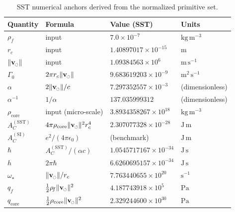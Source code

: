 \documentclass[pdflatex,sn-mathphys-num]{revtex4-2}
\newcommand{\swirlarrow}{\mathchoice{\mkern-2mu\scriptstyle\boldsymbol{\circlearrowleft}}{\mkern-2mu\scriptstyle\boldsymbol{\circlearrowleft}}{\mkern-2mu\scriptscriptstyle\boldsymbol{\circlearrowleft}}{\mkern-2mu\scriptscriptstyle\boldsymbol{\circlearrowleft}}}
\newcommand{\rhoF}{\rho_{\!f}}   %
\newcommand{\rhocore}{\rho_{\text{core}}}
\newcommand{\vswirl}{\mathbf{v}_{\swirlarrow}}
\newcommand{\vnorm}{\lVert \vswirl \rVert}
\providecommand{\rc}{r_c}
\newcommand{\clight}{c}
\begin{document}
        \begin{table}[h]
            \centering
            \caption{SST numerical anchors derived from the normalized primitive set.}
            \label{tab:anchors}
            \begin{tabular}{@{}llll@{}}
                \toprule
                Quantity & Formula & Value (SST) & Units \\ \midrule
                \(\rhoF\) & input & \(7.0\times 10^{-7}\) & \(\mathrm{kg\,m^{-3}}\) \\
                \(\rc\) & input & \(1.40897017\times 10^{-15}\) & \(\mathrm{m}\) \\
                \(\vnorm\) & input & \(1.09384563\times 10^{6}\) & \(\mathrm{m\,s^{-1}}\) \\
                \(\Gamma_0\) & \(2\pi\rc\vnorm\) & \(9.683619203\times 10^{-9}\) & \(\mathrm{m^2\,s^{-1}}\) \\
                \(\alpha\) & \(2\vnorm/\clight\) & \(7.297352557\times 10^{-3}\) & (dimensionless) \\
                \(\alpha^{-1}\) & \(1/\alpha\) & \(137.035999312\) & (dimensionless) \\
                \(\rhocore\) & input (micro-scale) & \(3.8934358267\times 10^{18}\) & \(\mathrm{kg\,m^{-3}}\) \\
                \(A_C^{\mathrm{(SST)}}\) & \(4\pi\rhocore\vnorm^2\rc^4\) & \(2.307077328\times 10^{-28}\) & \(\mathrm{J\,m}\) \\
                \(A_C^{\mathrm{(SI)}}\) & \(e^2/(4\pi\epsilon_0)\) & (benchmark) & \(\mathrm{J\,m}\) \\
                \(\hbar\) & \(A_C^{\mathrm{(SST)}}/(\alpha\clight)\) & \(1.0545717167\times 10^{-34}\) & \(\mathrm{J\,s}\) \\
                \(h\) & \(2\pi\hbar\) & \(6.6260695157\times 10^{-34}\) & \(\mathrm{J\,s}\) \\
                \(\omega_\star\) & \(\vnorm/\rc\) & \(7.763440655\times 10^{20}\) & \(\mathrm{s^{-1}}\) \\
                \(q_f\) & \(\tfrac{1}{2}\rhoF\vnorm^2\) & \(4.187743918\times 10^{5}\) & \(\mathrm{Pa}\) \\
                \(q_{\text{core}}\) & \(\tfrac{1}{2}\rhocore\vnorm^2\) & \(2.329244600\times 10^{30}\) & \(\mathrm{Pa}\) \\
                \bottomrule
            \end{tabular}
        \end{table}
\end{document}
